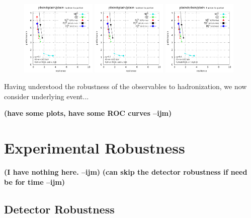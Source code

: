 \documentclass[11pt,letterpaper]{article}
\newcommand{\ijm}[1]{\textbf{\textcolor{llblue}{(#1 --ijm)}}}
\begin{document}
\begin{figure}
  \includegraphics[width=0.32\textwidth,page=62]{figures/shape-scan-levels.pdf}
  \hfill
  \includegraphics[width=0.32\textwidth,page=56]{figures/shape-scan-levels.pdf}
  \hfill
  \includegraphics[width=0.32\textwidth,page=50]{figures/shape-scan-levels.pdf}
  \caption{}\label{fig:shapes-UE}
\end{figure}

Having understood the robustness of the observables to hadronization, we now consider underlying event...

\ijm{have some plots, have some ROC curves}

\section{Experimental Robustness}\label{sec:exp}


\ijm{I have nothing here.}   \ijm{can skip the detector robustness if need be for time}

\subsection{Detector Robustness}\label{sec:detector_robust}
\end{document}
